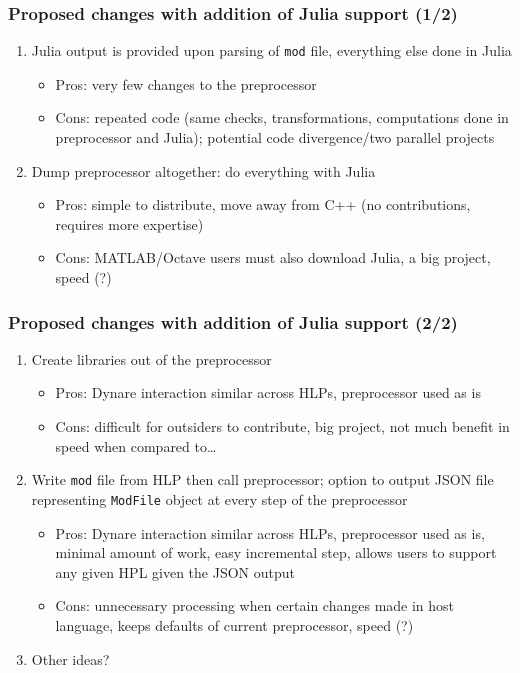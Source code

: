 \documentclass{beamer}
\begin{document}
\begin{frame}
  \frametitle{Proposed changes with addition of Julia support (1/2)}
  \begin{enumerate}
  \item Julia output is provided upon parsing of \texttt{mod} file, everything else done in Julia
    \begin{itemize}
    \item Pros: very few changes to the preprocessor
    \item Cons: repeated code (same checks, transformations, computations done in preprocessor and Julia); potential code divergence/two parallel projects
    \end{itemize}
  \item Dump preprocessor altogether: do everything with Julia
    \begin{itemize}
    \item Pros: simple to distribute, move away from C++ (no contributions, requires more expertise)
    \item Cons: MATLAB/Octave users must also download Julia, a big project, speed (?)
    \end{itemize}
    \asuivre
  \end{enumerate}
\end{frame}

\begin{frame}
  \frametitle{Proposed changes with addition of Julia support (2/2)}
  \begin{enumerate}
    \suite
  \item Create libraries out of the preprocessor
    \begin{itemize}
    \item Pros: Dynare interaction similar across HLPs, preprocessor used as is
    \item Cons: difficult for outsiders to contribute, big project, not much benefit in speed when compared to\ldots
    \end{itemize}
  \item Write \texttt{mod} file from HLP then call preprocessor; option to output JSON file representing \texttt{ModFile} object at every step of the preprocessor
    \begin{itemize}
    \item Pros: Dynare interaction similar across HLPs, preprocessor used as is, minimal amount of work, easy incremental step, allows users to support any given HPL given the JSON output
    \item Cons: unnecessary processing when certain changes made in host language, keeps defaults of current preprocessor, speed (?)
    \end{itemize}
  \item Other ideas?
  \end{enumerate}
\end{frame}
\end{document}
